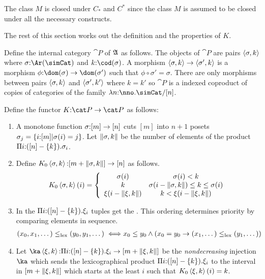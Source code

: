 \documentclass[csh.tex]{subfiles}
\begin{document}
\begin{remark} 
The class $M$ is closed under $C_*$ and $C^*$ since the class $M$ is assumed to be closed under all the necessary constructs. \end{remark}


The rest of this section works out the definition and the properties of $K$.

\begin{definition}
Define the internal category $\cat P$ of $\mathfrak A$ as follows. The objects of $\cat P$ are pairs $\left\langle \sigma,k \right\rangle$ where $\sigma\of\Ar(\simCat)$ and $k\of \cod(\sigma)$. A morphism $\left\langle \sigma,k \right\rangle\to \left\langle \sigma',k \right\rangle$ is a morphism $\phi\of \dom(\sigma)\to \dom(\sigma')$ such that $\phi\circ \sigma'= \sigma$. There are only morphisms between pairs $\left\langle \sigma,k \right\rangle$ and $\left\langle \sigma',k' \right\rangle$ where $k=k'$ so $\cat P$ is a indexed coproduct of copies of categories of the family $\function{n\of\nno}\simCat/[n]$.

Define the functor $K\of \cat P\to\cat P$ as follows:
\begin{enumerate}
\item A monotone function $\sigma\mathord :[m]\to[n]$ cuts $[m]$ into $n + 1$ posets $\sigma_j = \left\{i\mathord :[m]|\sigma(i)=j\right\}$. 
 Let $\Vert \sigma,k \Vert$ be the number of elements of the product $\Pi i\mathord : ([n]-\left\{k\right\}) .{\sigma_i}$. 
\item Define $K_0\left\langle \sigma,k \right\rangle\mathord : [m+\Vert \sigma,k \Vert]\to [n]$ as follows.
\[ 
	K_0\left\langle \sigma,k \right\rangle(i) = \left\{
		\begin{array}{cc}
			\sigma(i) & \sigma(i)<k \\
			k & \sigma(i-\Vert \sigma,k \Vert)\leq k \leq \sigma(i)\\
			\xi(i-\Vert \xi,k \Vert) & k<\xi(i-\Vert \xi,k \Vert)
		\end{array}
	\right.
\]

\item In the  $\Pi i\mathord :([n]-\left\{k\right\}) .{\xi_i}$ tuples get the . This ordering determines priority by comparing elements in sequence.
\begin{align*} 
(x_0,x_1,\dotsc) \leq_{\rm lex} (y_0,y_1,\dotsc) \iff& x_0\leq y_0 \land (x_0=y_0 \to (x_1,\dotsc)\leq_{\rm lex}(y_1,\dotsc))
\end{align*}

\item Let $\ka\tuplet{\xi,k}\of\product{i\of([n]-\set k)}{\xi_i} \to [m+\norm{\xi,k}]$ be the \emph{nondecreasing} injection $\ka$ which sends the lexicographical product $\Pi i\mathord :([n]-\left\{k\right\}) .{\xi_i}$ to the interval in $[m+\Vert \xi,k \Vert]$ which starts at the least $i$ such that $K_0\left\langle \xi,k \right\rangle(i)=k$.


\end{enumerate}
\end{definition}
\end{document}
